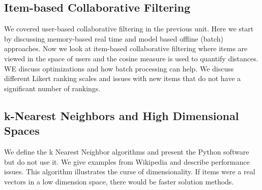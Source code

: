 \subsection{Item-based Collaborative Filtering}

We covered user-based collaborative filtering in the previous unit. Here
we start by discussing memory-based real time and model based offline
(batch) approaches. Now we look at item-based collaborative filtering
where items are viewed in the space of users and the cosine measure is
used to quantify distances. WE discuss optimizations and how batch
processing can help. We discuss different Likert ranking scales and
issues with new items that do not have a significant number of rankings.




\subsection{k-Nearest Neighbors and High Dimensional Spaces}

We define the k Nearest Neighbor algorithms and present the Python
software but do not use it. We give examples from Wikipedia and describe
performance issues. This algorithm illustrates the curse of
dimensionality. If items were a real vectors in a low dimension space,
there would be faster solution methods.


